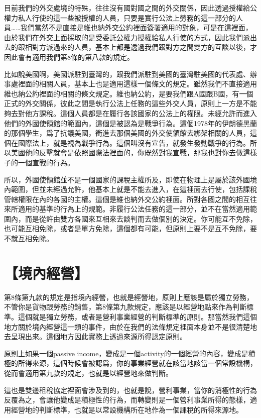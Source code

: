 \documentclass[]{ctexbook}
\begin{document}
目前我們的外交處境的特殊，往往沒有國對國之間的外交關係，因此透過授權給公權力私人行使的這一些被授權的人員，只要是實行公法上勞務的這一部分的人員\ldots\ldots 我們當然不是直接是維也納外交公約裡面簽署適用的對象，可是在這裡面，由於我們在外交上面採取的是受委託公權力授權給私人行使的方式，因此我們派出去的跟相對方派過來的人員，基本上都是透過我們跟對方之間雙方的互談以後，才因此會有適用我們第8條的第八款的規定。

比如說美國啊，美國派駐到臺灣的，跟我們派駐到美國的臺灣駐美國的代表處、辦事處裡面的相關人員，基本上也是適用這樣一個條文的規定。雖然我們不直接適用維也納公約裡面的相關的條文規定。維也納公約，是要我們跟A國跟B國，有一個正式的外交關係，彼此之間是執行公法上任務的這些外交人員，原則上一方是不能夠去對他方課稅。這個人員都是在履行各該國家的公法上的權限。未經允許而進入他們的外國使領館的範圍內，這個是被認為是戰爭行為。這個1978年的伊朗德黑蘭的那個學生，爲了抗議美國，衝進去那個美國的外交使領館去綁架相關的人員，這個在國際法上，就是視為戰爭行為。這個叫沒有宣告，就發生發動戰爭的行為。所以美國他的反擊就會是依照國際法裡面的，你既然對我宣戰，那我也對你去做這樣子的一個宣戰的行為。

所以，外國使領館並不是一個國家的課稅主權所及，即使在物理上是屬於該外國境內範圍，但並未經過允許，他基本上就是不能去進入，在這裡面去行使，包括課稅管轄權限在內的各國的主權。這個是維也納外交公約裡面。所對各國之間的相互往來所適用的基準的行為上的規範。非履行公法任務的這一部分，並不在當然適用範圍內，而是從許由雙方各國來互相來去談判而去做個別的決定。你可能互不免除，也可能互相免除，或者是單方免除，這個都有可能，但原則上要不是互不免除，要不就互相免除。

\hypertarget{ux5883ux5167ux7d93ux71df}{%
\section{【境內經營】}\label{ux5883ux5167ux7d93ux71df}}

第8條第九款的規定是指境內經營，也就是經營地，原則上應該是屬於獨立勞務，不管你是貨物跟勞務的銷售，第8條第九款規定，應該是以經營地點來作為判斷標準。這個就是獨立勞務，或者是營利事業經營的判斷標準的原則。那當然我們這個地方關於境內經營這一類的事件，由於在我們的法條規定裡面本身並不是很清楚地去呈現出來。這個地方因此實務上透過來源所得認定原則。

原則上如果一個passive income，變成是一個activity的一個經營的內容，變成是積極的所得來源，這個時候會被認爲，你的事業經營就在該當地該當一個常設機構，從而會適用第九款的規定，也就是以經營地來做判斷。

這也是雙邊租稅協定裡面會涉及到的，也就是說，營利事業，當你的消極性的行為反覆為之，會讓他變成是積極性的行為，而轉變則是一個營利事業所得的態樣，適用經營地的判斷標準，也就是以常設機構所在地作為一個課稅的所得來源地。
\end{document}
